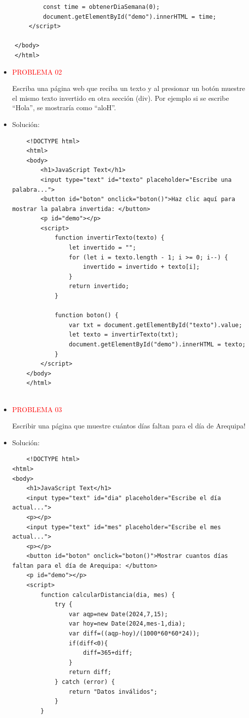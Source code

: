\documentclass{article}
\begin{document}
\begin{itemize}
\begin{itemize}
\begin{verbatim}
            const time = obtenerDiaSemana(0);
            document.getElementById("demo").innerHTML = time;
        </script>

    </body>
    </html>
    \end{verbatim}

\end{itemize}
\begin{itemize}
    \item \textcolor{red}{PROBLEMA 02}
    
    Escriba una página web que reciba un texto y al presionar un botón muestre el mismo texto invertido en otra sección (div). Por ejemplo si se escribe “Hola”, se mostraría como “aloH”.
    
    \item Solución:
    \begin{verbatim}
    <!DOCTYPE html>
    <html>
    <body>
        <h1>JavaScript Text</h1>
        <input type="text" id="texto" placeholder="Escribe una palabra...">
        <button id="boton" onclick="boton()">Haz clic aquí para mostrar la palabra invertida: </button>
        <p id="demo"></p>
        <script>
            function invertirTexto(texto) {
                let invertido = "";
                for (let i = texto.length - 1; i >= 0; i--) {
                    invertido = invertido + texto[i];
                }
                return invertido;
            }
    
            function boton() {
                var txt = document.getElementById("texto").value;
                let texto = invertirTexto(txt);
                document.getElementById("demo").innerHTML = texto;
            }
        </script>
    </body>
    </html>
    
    \end{verbatim}

\end{itemize}
\begin{itemize}
    \item \textcolor{red}{PROBLEMA 03}
    
    Escribir una página que muestre cuántos días faltan para el día de Arequipa!
    
    \item Solución:
    \begin{verbatim}
    <!DOCTYPE html>
<html>
<body>
    <h1>JavaScript Text</h1>
    <input type="text" id="dia" placeholder="Escribe el día actual...">
    <p></p>
    <input type="text" id="mes" placeholder="Escribe el mes actual...">
    <p></p>
    <button id="boton" onclick="boton()">Mostrar cuantos días faltan para el día de Arequipa: </button>
    <p id="demo"></p>
    <script>
        function calcularDistancia(dia, mes) {
            try {
            	var aqp=new Date(2024,7,15);
                var hoy=new Date(2024,mes-1,dia);
                var diff=((aqp-hoy)/(1000*60*60*24));
                if(diff<0){
                	diff=365+diff;
                }
                return diff;
            } catch (error) {
                return "Datos inválidos";
            }
        }


\end{verbatim}
\end{itemize}
\end{itemize}
\end{document}

